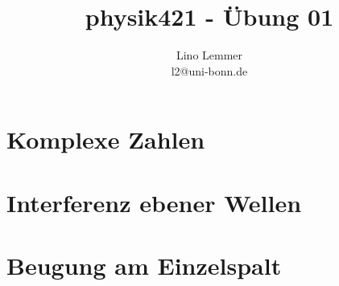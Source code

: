 

\setcounter{thezettel}{1}
\renewcommand\thesection{\arabic{thezettel}.\arabic{section}}

\title{physik421 - Übung 01}
\author{Lino Lemmer \\ \small{l2@uni-bonn.de}}


\maketitle

\section{Komplexe Zahlen}

\section{Interferenz ebener Wellen}

\section{Beugung am Einzelspalt}


